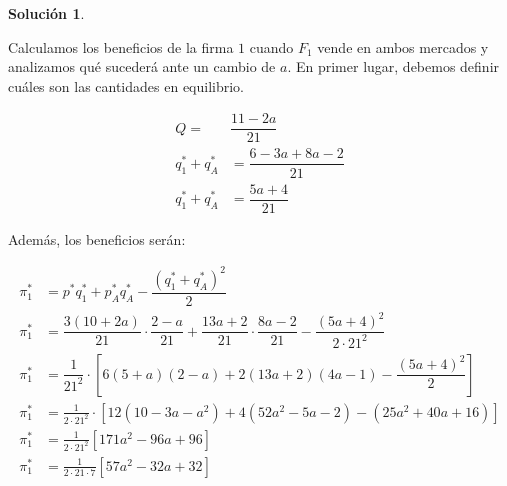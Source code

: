 \documentclass[a4paper, 11pt]{article}
\theoremstyle{definition}
\newtheorem{solucion}{Soluci\'on}
\begin{document}
\begin{solucion}
\begin{enumerate}[label=(\alph*)]
\begin{enumerate}[label=\roman*.]
 
 Calculamos los beneficios de la firma $1$ cuando $F_1$ vende en ambos mercados y analizamos qué sucederá ante un cambio de $a$. En primer lugar, debemos definir cuáles son las cantidades en equilibrio.
 
 \vspace*{-12pt}
 
 \begin{align*}
 Q=&\dfrac{11-2a}{21}\\
 q_1^*+q_A^*&=\dfrac{6-3a+8a-2}{21} \\
 q_1^*+q_A^*&=\dfrac{5a+4}{21}
 \end{align*}
 
 Además, los beneficios serán:
 
 \vspace*{-12pt}
 
 \begin{align*}
 \pi_1^*&=p^*q_1^*+p_A^*q_A^*-\dfrac{(q_1^*+q_A^*)^2}{2}\\
 \pi_1^*&=\dfrac{3(10+2a)}{21}\cdot\dfrac{2-a}{21}+\dfrac{13a+2}{21}\cdot\dfrac{8a-2}{21}-\dfrac{(5a+4)^2}{2\cdot21^2}\\
 \pi_1^*&=\dfrac{1}{21^2}\cdot\left[6(5+a)(2-a)+2(13a+2)(4a-1)-\dfrac{(5a+4)^2}{2}\right]\\
 \pi_1^*&=\frac{1}{2\cdot21^2}\cdot[12(10-3a-a^2)+4(52a^2-5a-2)-(25a^2+40a+16)]\\
 \pi_1^*&=\frac{1}{2\cdot21^2}[171a^2-96a+96]\\
 \pi_1^*&=\frac{1}{2\cdot21\cdot7}[57a^2-32a+32]
 \end{align*}
 

\end{enumerate}
\end{enumerate}
\end{solucion}
\end{document}
